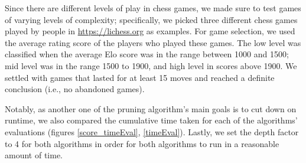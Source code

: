 \documentclass[letterpaper]{article}
\begin{document}
Since there are different levels of play in chess games, we made sure to test games of varying levels of complexity; specifically, we picked three different chess games played by people in \url{https://lichess.org} as examples. For game selection, we used the average rating score of the players who played these games. The low level was classified when the average Elo score was in the range between 1000 and 1500; mid level was in the range 1500 to 1900, and high level in scores above 1900. We settled with games that lasted for at least 15 moves and reached a definite conclusion (i.e., no abandoned games).

Notably, as another one of the pruning algorithm’s main goals is to cut down on runtime, we also compared the cumulative time taken for each of the algorithms' evaluations (figures \ref{score_timeEval}, \ref{timeEval}).  Lastly, we set the depth factor to 4 for both algorithms in order for both algorithms to run in a reasonable amount of time.
\end{document}
